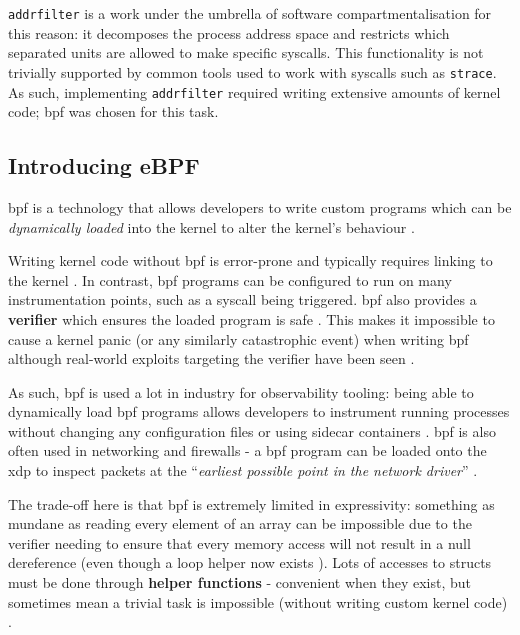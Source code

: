 \texttt{addrfilter} is a work under the umbrella of software
compartmentalisation for this reason: it decomposes the process address space
and restricts which separated units are allowed to make specific syscalls.
This functionality is not trivially supported by common tools used to work with
syscalls such as \texttt{strace}. As such, implementing \texttt{addrfilter}
required writing extensive amounts of kernel code; \ac{bpf} was chosen for this
task.

\subsection{Introducing eBPF}

\ac{bpf} is a technology that allows developers to write custom programs which
can be \textit{dynamically loaded} into the kernel to alter the kernel's
behaviour \cite{LEARNING_EBPF}. 

Writing kernel code without \ac{bpf} is error-prone and typically
requires linking to the kernel \cite{UNDERSTANDING_LINUX_KERNEL}. In contrast,
\ac{bpf} programs can be configured to run on many instrumentation points, such
as a syscall being triggered. \ac{bpf} also provides a \textbf{verifier} which ensures the  loaded program is safe \cite{LEARNING_EBPF}.
This makes it impossible to cause a kernel panic (or any similarly
catastrophic event) when writing \ac{bpf} although real-world exploits targeting the
verifier have been seen \cite{BPF_VERIFIER_EXPLOIT}. 

As such, \ac{bpf} is used a lot in industry for observability tooling: being able to
dynamically load \ac{bpf} programs allows developers to instrument running processes
without changing any configuration files or using sidecar containers \cite{SIDECAR}.
\ac{bpf} is also often used in networking and firewalls \cite{LINUX_NETWORKING_OBSERVABILITY} - a \ac{bpf} program can
be loaded onto the \ac{xdp} to inspect packets at the ``\textit{earliest possible
point in the network driver}'' \cite{CILIUM_BPF_XDP_INTRO}. 

The trade-off here is that \ac{bpf} is extremely limited in expressivity:
something as mundane as reading every element of an array can be impossible due
to the verifier needing to ensure that every memory access will not result in 
a null dereference (even though a loop helper now exists \cite{BPF_LOOP_COMMIT}). Lots of accesses to structs must be done through
\textbf{helper functions} - convenient when they exist, but sometimes mean a
trivial task is impossible (without writing custom kernel code) \cite{bpf_kfuncs_docs}.


